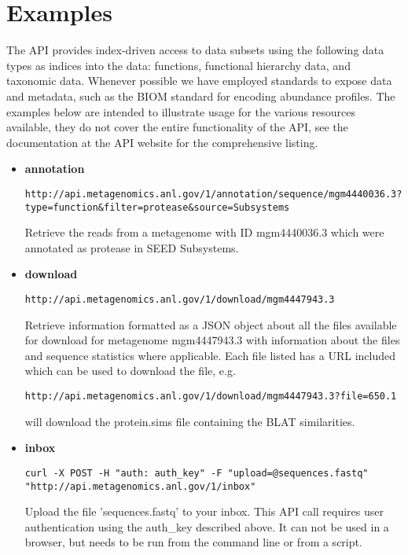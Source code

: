 \section{Examples}
The API provides index-driven access to data subsets using the following data types as indices into the data: functions, functional hierarchy data, and taxonomic data. Whenever possible we have employed standards to expose data and metadata, such as the BIOM standard for encoding abundance profiles. The examples below are intended to illustrate usage for the various resources available, they do not cover the entire functionality of the API, see the documentation at the API website for the comprehensive listing.

\begin{itemize}
\item 
\textbf{annotation}
\begin{small}
\begin{lstlisting}
http://api.metagenomics.anl.gov/1/annotation/sequence/mgm4440036.3?type=function&filter=protease&source=Subsystems
\end{lstlisting}
\end{small} Retrieve the reads from a metagenome with ID mgm4440036.3 which were annotated as  protease in SEED Subsystems.

\item
\textbf{download}
\begin{small}
\begin{lstlisting}
http://api.metagenomics.anl.gov/1/download/mgm4447943.3
\end{lstlisting}
\end{small} Retrieve information formatted as a JSON object about all the files available for download for metagenome mgm4447943.3 with information about the files and sequence statistics where applicable. Each file listed has a URL included which can be used to download the file, e.g.
\begin{small}
\begin{lstlisting}
http://api.metagenomics.anl.gov/1/download/mgm4447943.3?file=650.1
\end{lstlisting}
\end{small} will download the protein.sims file containing the BLAT similarities.

\item
\textbf{inbox}
\begin{small}
\begin{lstlisting}
curl -X POST -H "auth: auth_key" -F "upload=@sequences.fastq" "http://api.metagenomics.anl.gov/1/inbox"
\end{lstlisting}
\end{small}
Upload the file 'sequences.fastq' to your inbox. This API call requires user authentication using the auth\_key described above. It can not be used in a browser, but needs to be run from the command line or from a script.


\end{itemize}

